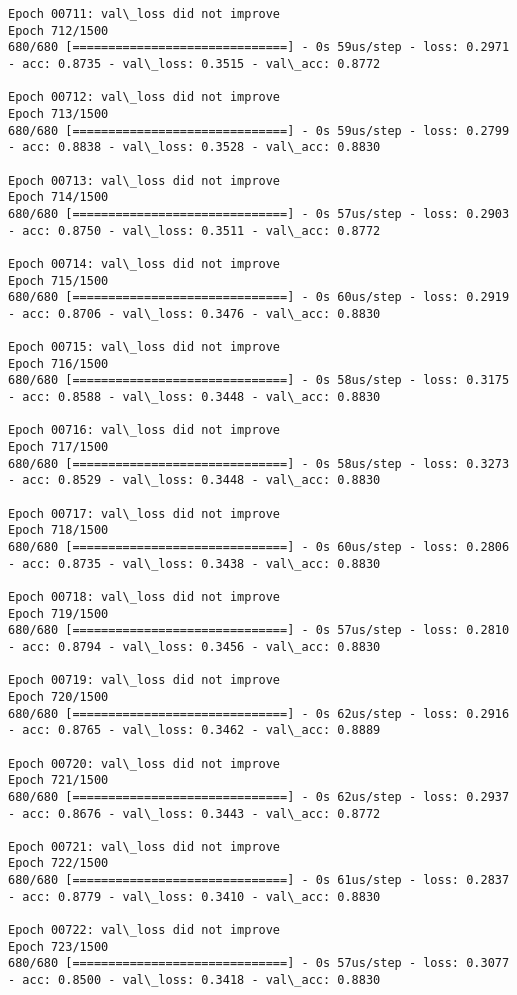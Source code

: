 \documentclass[11pt]{article}
\begin{document}
\begin{Verbatim}[commandchars=\\\{\}]
Epoch 00711: val\_loss did not improve
Epoch 712/1500
680/680 [==============================] - 0s 59us/step - loss: 0.2971 - acc: 0.8735 - val\_loss: 0.3515 - val\_acc: 0.8772

Epoch 00712: val\_loss did not improve
Epoch 713/1500
680/680 [==============================] - 0s 59us/step - loss: 0.2799 - acc: 0.8838 - val\_loss: 0.3528 - val\_acc: 0.8830

Epoch 00713: val\_loss did not improve
Epoch 714/1500
680/680 [==============================] - 0s 57us/step - loss: 0.2903 - acc: 0.8750 - val\_loss: 0.3511 - val\_acc: 0.8772

Epoch 00714: val\_loss did not improve
Epoch 715/1500
680/680 [==============================] - 0s 60us/step - loss: 0.2919 - acc: 0.8706 - val\_loss: 0.3476 - val\_acc: 0.8830

Epoch 00715: val\_loss did not improve
Epoch 716/1500
680/680 [==============================] - 0s 58us/step - loss: 0.3175 - acc: 0.8588 - val\_loss: 0.3448 - val\_acc: 0.8830

Epoch 00716: val\_loss did not improve
Epoch 717/1500
680/680 [==============================] - 0s 58us/step - loss: 0.3273 - acc: 0.8529 - val\_loss: 0.3448 - val\_acc: 0.8830

Epoch 00717: val\_loss did not improve
Epoch 718/1500
680/680 [==============================] - 0s 60us/step - loss: 0.2806 - acc: 0.8735 - val\_loss: 0.3438 - val\_acc: 0.8830

Epoch 00718: val\_loss did not improve
Epoch 719/1500
680/680 [==============================] - 0s 57us/step - loss: 0.2810 - acc: 0.8794 - val\_loss: 0.3456 - val\_acc: 0.8830

Epoch 00719: val\_loss did not improve
Epoch 720/1500
680/680 [==============================] - 0s 62us/step - loss: 0.2916 - acc: 0.8765 - val\_loss: 0.3462 - val\_acc: 0.8889

Epoch 00720: val\_loss did not improve
Epoch 721/1500
680/680 [==============================] - 0s 62us/step - loss: 0.2937 - acc: 0.8676 - val\_loss: 0.3443 - val\_acc: 0.8772

Epoch 00721: val\_loss did not improve
Epoch 722/1500
680/680 [==============================] - 0s 61us/step - loss: 0.2837 - acc: 0.8779 - val\_loss: 0.3410 - val\_acc: 0.8830

Epoch 00722: val\_loss did not improve
Epoch 723/1500
680/680 [==============================] - 0s 57us/step - loss: 0.3077 - acc: 0.8500 - val\_loss: 0.3418 - val\_acc: 0.8830


\end{Verbatim}
\end{document}
